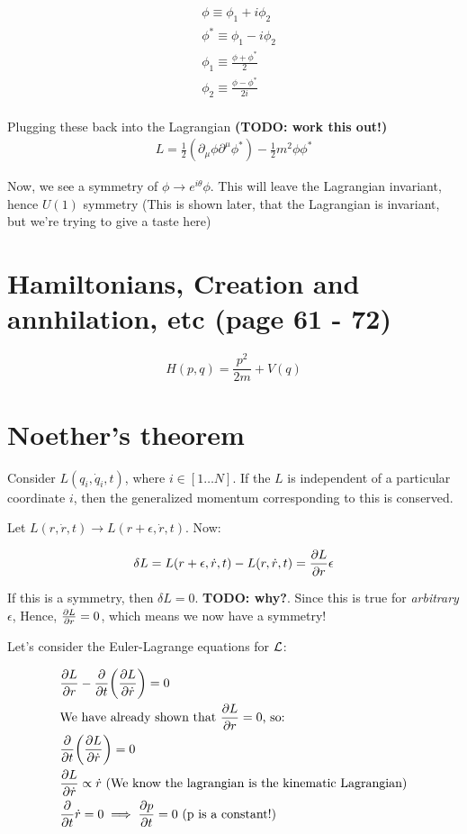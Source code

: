 \begin{align*}
&\phi \equiv \phi_1 + i \phi_2 \\
&\phi^* \equiv \phi_1 - i \phi_2 \\
&\phi_1 \equiv \frac{\phi + \phi^*}{2} \\
&\phi_2 \equiv   \frac{\phi - \phi^*}{2i} \\
\end{align*}

Plugging these back into the Lagrangian \textbf{(TODO: work this out!)}
\begin{align*}
L = \frac{1}{2}(\partial_\mu \phi \partial^\mu \phi^*) - \frac{1}{2}m^2 \phi \phi^*
\end{align*}

Now, we see a symmetry of $\phi \to e^{i \theta}\phi$. This will leave the Lagrangian invariant, hence
$U(1)$ symmetry (This is shown later, that the Lagrangian is invariant, but we're trying to give a taste here)


\chapter{Hamiltonians, Creation and annhilation, etc (page 61 - 72)}
$$H(p, q) = \frac{p^2}{2m} + V(q)$$

\chapter{Noether's theorem}

Consider $L(q_i, \dot q_i, t)$, where $i \in [1\dots N]$.
If the $L$ is independent of a particular coordinate $i$, then the generalized momentum
corresponding to this is conserved.

Let $L(r, \dot r, t) \to L(r + \epsilon, \dot r, t)$. Now:

\begin{align*}
\delta L = L(r + \epsilon, \dot r, t) - L(r, \dot r, t) = \pdv{L}{r} \epsilon
\end{align*}

If this is a symmetry, then $\delta L = 0$. \textbf{TODO: why?}. Since this is
true for \textit{arbitrary} $\epsilon$, Hence, $\pdv{L}{r} = 0$, which means
we now have a symmetry!

Let's consider the Euler-Lagrange equations for $\mathcal{L}$:

\begin{align*}
 &\pdv{L}{r} - \pdv{t} \bigg( \pdv{L}{\dot r} \bigg) = 0 \\
&\text{We have already shown that $\pdv{L}{r} = 0$, so:} \\
&\pdv{t} \bigg( \pdv{L}{\dot r} \bigg) = 0 \\
&\pdv{L}{\dot r} \propto \dot r~\text{(We know the lagrangian is the kinematic Lagrangian)} \\
&\pdv{t} \dot r = 0 \implies \pdv{p}{t} = 0~\text{(p is a constant!)}
\end{align*}

